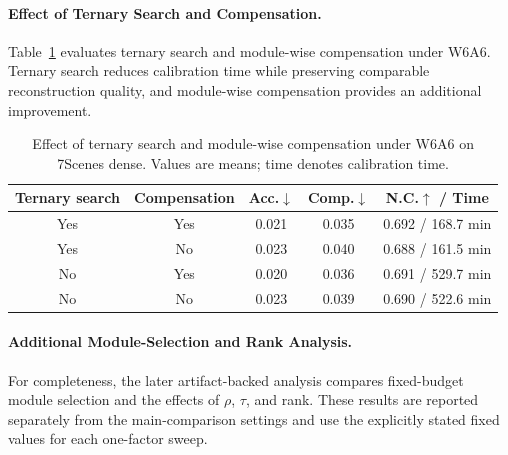 \documentclass[journal]{Tail_Aware_Post_Training_Quantization_for_3D_Geometry_Models_TMM/IEEEtran}
\begin{document}
\paragraph{Effect of Ternary Search and Compensation.}
Table~\ref{tab:ternary_comp_ablation_7scenes} evaluates ternary search and module-wise compensation under W6A6. Ternary search reduces calibration time while preserving comparable reconstruction quality, and module-wise compensation provides an additional improvement.

\begin{table}[t]
\caption{Effect of ternary search and module-wise compensation under W6A6 on 7Scenes dense. Values are means; time denotes calibration time.}
\label{tab:ternary_comp_ablation_7scenes}
\centering
\scriptsize
\setlength{\tabcolsep}{4pt}
\begin{tabular}{ccccc}
\toprule
Ternary search & Compensation & Acc.$\downarrow$ & Comp.$\downarrow$ & N.C.$\uparrow$ / Time \\
\midrule
Yes & Yes & 0.021 & 0.035 & 0.692 / 168.7 min \\
Yes & No & 0.023 & 0.040 & 0.688 / 161.5 min \\
No & Yes & 0.020 & 0.036 & 0.691 / 529.7 min \\
No & No & 0.023 & 0.039 & 0.690 / 522.6 min \\
\bottomrule
\end{tabular}
\end{table}

\paragraph{Additional Module-Selection and Rank Analysis.}
For completeness, the later artifact-backed analysis compares fixed-budget module selection and the effects of $\rho$, $\tau$, and rank. These results are reported separately from the main-comparison settings and use the explicitly stated fixed values for each one-factor sweep.
\end{document}

